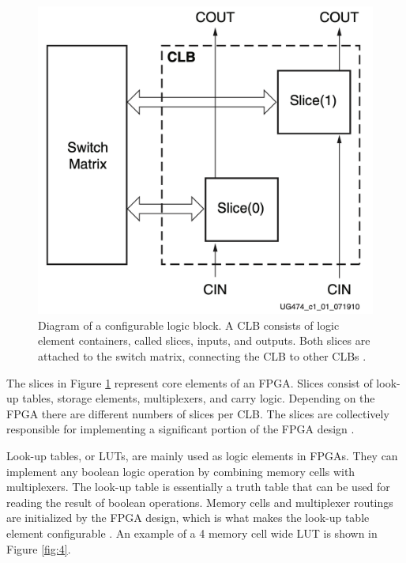 \documentclass[12pt]{report}
\begin{document}
\begin{figure}[h]
    \centering
    \includegraphics[scale=0.25]{figures/clb.png}
    \caption{Diagram of a configurable logic block. A CLB consists of logic element containers, called slices, inputs, and outputs. Both slices are attached to the switch matrix, connecting the CLB to other CLBs \citep{XilClbMan}.}
    \label{fig:3}
\end{figure}

The slices in Figure \ref{fig:3} represent core elements of an FPGA. Slices consist of look-up tables, storage elements, multiplexers, and carry logic. Depending on the FPGA there are different numbers of slices per CLB. The slices are collectively responsible for implementing a significant portion of the FPGA design \citep{XilClbMan}.
\par
Look-up tables, or LUTs, are mainly used as logic elements in FPGAs. They can implement any boolean logic operation by combining memory cells with multiplexers. The look-up table is essentially a truth table that can be used for reading the result of boolean operations. Memory cells and multiplexer routings are initialized by the FPGA design, which is what makes the look-up table element configurable \citep{XilFPGAIntro}. An example of a 4 memory cell wide LUT is shown in Figure \ref{fig:4}.
\end{document}
